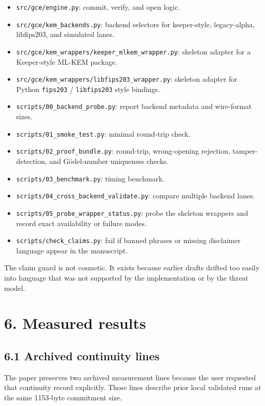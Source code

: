 \documentclass[
  11pt,
]{article}
\providecommand{\tightlist}{%
  \setlength{\itemsep}{0pt}\setlength{\parskip}{0pt}}
\begin{document}
\begin{itemize}
\tightlist
\item
  \texttt{src/gce/engine.py}: commit, verify, and open logic.
\item
  \texttt{src/gce/kem\_backends.py}: backend selectors for keeper-style,
  legacy-alpha, libfips203, and simulated lanes.
\item
  \texttt{src/gce/kem\_wrappers/keeper\_mlkem\_wrapper.py}: skeleton
  adapter for a Keeper-style ML-KEM package.
\item
  \texttt{src/gce/kem\_wrappers/libfips203\_wrapper.py}: skeleton
  adapter for Python \texttt{fips203} / \texttt{libfips203} style
  bindings.
\item
  \texttt{scripts/00\_backend\_probe.py}: report backend metadata and
  wire-format sizes.
\item
  \texttt{scripts/01\_smoke\_test.py}: minimal round-trip check.
\item
  \texttt{scripts/02\_proof\_bundle.py}: round-trip, wrong-opening
  rejection, tamper-detection, and Gödel-number uniqueness checks.
\item
  \texttt{scripts/03\_benchmark.py}: timing benchmark.
\item
  \texttt{scripts/04\_cross\_backend\_validate.py}: compare multiple
  backend lanes.
\item
  \texttt{scripts/05\_probe\_wrapper\_status.py}: probe the skeleton
  wrappers and record exact availability or failure modes.
\item
  \texttt{scripts/check\_claims.py}: fail if banned phrases or missing
  disclaimer language appear in the manuscript.
\end{itemize}

The claim guard is not cosmetic. It exists because earlier drafts
drifted too easily into language that was not supported by the
implementation or by the threat model.

\section{6. Measured results}\label{measured-results}

\subsection{6.1 Archived continuity
lines}\label{archived-continuity-lines}

The paper preserves two archived measurement lines because the user
requested that continuity record explicitly. Those lines describe prior
local validated runs at the same 1153-byte commitment size.
\end{document}
